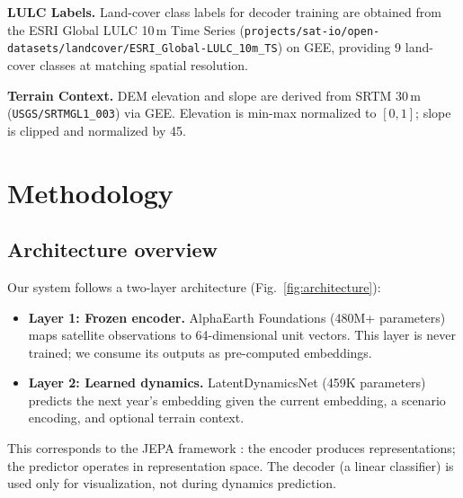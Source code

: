 \documentclass{article}
\begin{document}
\textbf{LULC Labels.} Land-cover class labels for decoder training are obtained from the ESRI Global LULC 10\,m Time Series (\texttt{projects/sat-io/open-datasets/landcover/ESRI\_Global-LULC\_10m\_TS}) on GEE, providing 9 land-cover classes at matching spatial resolution.

\textbf{Terrain Context.} DEM elevation and slope are derived from SRTM 30\,m (\texttt{USGS/SRTMGL1\_003}) via GEE. Elevation is min-max normalized to $[0,1]$; slope is clipped and normalized by 45\textdegree.


\section{Methodology}
\label{sec:method}

\subsection{Architecture overview}

Our system follows a two-layer architecture (Fig.~\ref{fig:architecture}):

\begin{itemize}
\item \textbf{Layer 1: Frozen encoder.} AlphaEarth Foundations (480M+ parameters) maps satellite observations to 64-dimensional unit vectors. This layer is never trained; we consume its outputs as pre-computed embeddings.
\item \textbf{Layer 2: Learned dynamics.} LatentDynamicsNet (459K parameters) predicts the next year's embedding given the current embedding, a scenario encoding, and optional terrain context.
\end{itemize}

This corresponds to the JEPA framework \citep{lecun2022jepa}: the encoder produces representations; the predictor operates in representation space. The decoder (a linear classifier) is used only for visualization, not during dynamics prediction.
\end{document}
